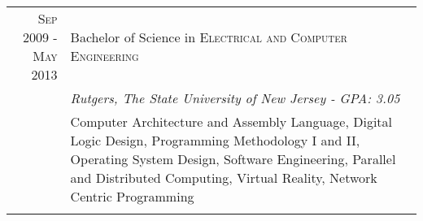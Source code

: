 \documentclass[a4paper,10pt, onepage]{article} %
\begin{document}
\begin{tabular}{r|p{10cm}}	
\textsc{Sep 2009 - May 2013} & Bachelor of Science in \textsc{Electrical and Computer Engineering}\\
& \small\emph{Rutgers, The State University of New Jersey -  GPA: 3.05}\\
& \footnotesize{Computer Architecture and Assembly Language, Digital Logic Design, Programming Methodology I and II, Operating System Design, Software Engineering, Parallel and Distributed Computing, Virtual Reality, Network Centric Programming}\\
\multicolumn{2}{c}{}\\
\end{tabular}



\end{document}

